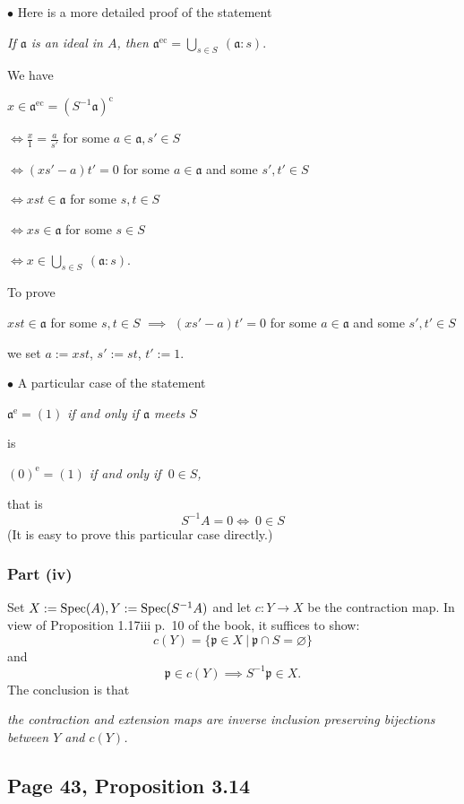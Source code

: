 \documentclass[parskip=half,fontsize=12pt]{scrartcl}%
\newcommand{\oo}{\operatorname}\newcommand{\ooo}{\operatorname*}
\newcommand{\mf}{\mathfrak}
\newcommand{\aaa}{\mf a}
\newcommand{\ppp}{\mf p}
\newcommand{\bu}{\bullet}
\newcommand{\ds}{\displaystyle}
\begin{document}
$\bu $ Here is a more detailed proof of the statement 

\emph{If $\aaa$ is an ideal in $A$, then $\aaa^{\oo{ec}}=\bigcup_{s\in S}\ (\aaa:s)$}.

We have 

$x\in\aaa^{\oo{ec}}=(S^{-1}\aaa)^{\oo c}$

$\ds\iff\frac{x}{1}=\frac{a}{s'}$ for some $a\in\aaa,s'\in S$ 

$\iff(xs'-a)t'=0$ for some $a\in\aaa$ and some $s',t'\in S$ 

$\iff xst\in\aaa$ for some $s,t\in S$

$\iff xs\in\aaa$ for some $s\in S$

$\iff x\in\bigcup_{s\in S}\ (\aaa:s)$.

To prove 

$xst\in\aaa$ for some $s,t\in S$ $\implies$ $(xs'-a)t'=0$ for some $a\in\aaa$ and some $s',t'\in S$

we set $a:=xst$, $s':=st$, $t':=1$.%

$\bu$ A particular case of the statement 

\emph{$\aaa^{\oo e}=(1)$ if and only if $\aaa$ meets $S$}

is 

\emph{$(0)^{\oo e}=(1)$ if and only if $\ 0\in S$,}

that is 
\begin{equation}\label{s-1a}
S^{-1}A=0\iff\ 0\in S
\end{equation}
(It is easy to prove this particular case directly.)

\subsubsection{Part (iv)}\label{prcor}%

Set $X:=\operatorname{Spec}(A),Y:=\operatorname{Spec}(S^{-1}A)$ and let $c:Y\to X$ be the contraction map. In view of Proposition 1.17iii p.~10 of the book, it suffices to show:
$$
c(Y)=\{\ppp\in X\ |\ \ppp\cap S=\varnothing\}
$$ 
and 
$$
\ppp\in c(Y)\implies S^{-1}\ppp\in X.
$$ 
The conclusion is that 

\emph{the contraction and extension maps are inverse inclusion preserving bijections between $Y$ and $c(Y)$.} 


\subsection{Page 43, Proposition 3.14}%
\end{document}
